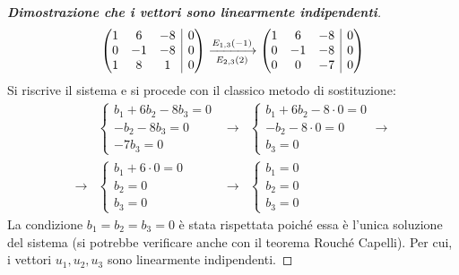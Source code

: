 \documentclass[a4paper]{article}
\makeatletter
\newenvironment{rowequmat}[1]{\left(\array{@{}#1@{}}}{\endarray\right)}
\makeatother
\begin{document}
\begin{proof}[\textbf{Dimostrazione che i vettori sono linearmente indipendenti}]
\begin{equation*}
\begin{rowequmat}{ccc|c}
				1 &  6 & -8 & 0 \\
				0 & -1 & -8 & 0 \\
				1 &  8 &  1 & 0
			\end{rowequmat} \xlongrightarrow[E_{2,3}\left(2\right)]{E_{1,3}\left(-1\right)}
			\begin{rowequmat}{ccc|c}
				1 &  6 & -8 & 0 \\
				0 & -1 & -8 & 0 \\
				0 &  0 & -7 & 0
			\end{rowequmat}
		\end{equation*}
		Si riscrive il sistema e si procede con il classico metodo di sostituzione:
		\begin{equation*}
			\begin{array}{lllll}
				&\begin{cases}
					b_{1} + 6b_{2} - 8b_{3} = 0 \\
					-b_{2} - 8b_{3} = 0 \\
					-7b_{3} = 0
				\end{cases} &\rightarrow&
				\begin{cases}
					b_{1} + 6b_{2} - 8 \cdot 0 = 0 \\
					-b_{2} - 8 \cdot 0 = 0 \\
					b_{3} = 0
				\end{cases} \rightarrow \\ [1.8em]
				\rightarrow & \begin{cases}
					b_{1} + 6 \cdot 0 = 0 \\
					b_{2} = 0 \\
					b_{3} = 0
				\end{cases} &\rightarrow&
				\begin{cases}
					b_{1} = 0 \\
					b_{2} = 0 \\
					b_{3} = 0
				\end{cases}
			\end{array}
		\end{equation*}
		La condizione $b_{1} = b_{2} = b_{3} = 0$ è stata rispettata poiché essa è l'unica soluzione del sistema (si potrebbe verificare anche con il teorema Rouché Capelli). Per cui, i vettori $u_{1}, u_{2}, u_{3}$ sono linearmente indipendenti.
	\end{proof}\newpage
	
\end{document}
